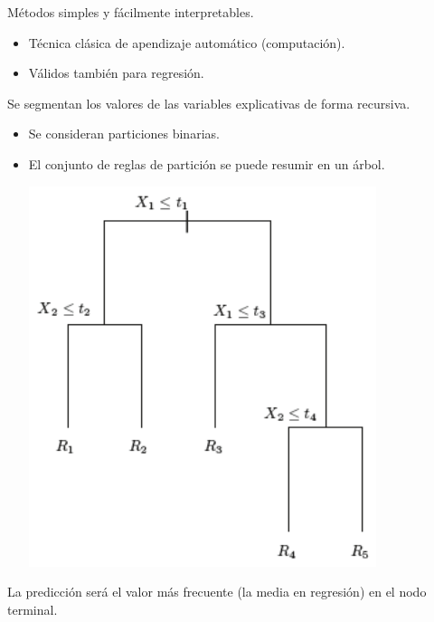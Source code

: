 \documentclass[]{book}
\begin{document}
Métodos simples y fácilmente interpretables.

\begin{itemize}
\item
  Técnica clásica de apendizaje automático (computación).
\item
  Válidos también para regresión.
\end{itemize}

Se segmentan los valores de las variables explicativas de forma
recursiva.

\begin{itemize}
\item
  Se consideran particiones binarias.
\item
  El conjunto de reglas de partición se puede resumir en un árbol.

  \includegraphics[width=4in]{images/arbol1}
\end{itemize}

La predicción será el valor más frecuente (la media en regresión) en
el nodo terminal.
\end{document}
